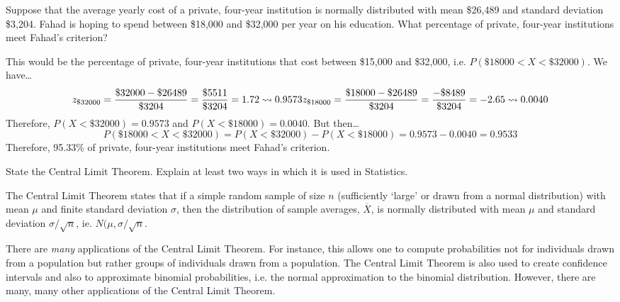 \documentclass[11pt,letterpaper]{article}
\begin{document}

 Suppose that the average yearly cost of a private, four-year institution is normally distributed with mean \$26,489 and standard deviation \$3,204. Fahad is hoping to spend between \$18,000 and \$32,000 per year on his education. What percentage of private, four-year institutions meet Fahad's criterion? \pspace

\sol This would be the percentage of private, four-year institutions that cost between \$15,000 and \$32,000, i.e. $P(\$18000 < X < \$32000)$. We have\dots
	\[
	\begin{aligned}
	z_{\$32000}= \dfrac{\$32000 - \$26489}{\$3204}= \dfrac{\$5511}{\$3204}= 1.72 \rightsquigarrow 0.9573
	z_{\$18000}= \dfrac{\$18000 - \$26489}{\$3204}= \dfrac{-\$8489}{\$3204}= -2.65 \rightsquigarrow 0.0040
	\end{aligned}
	\]
Therefore, $P(X < \$32000)= 0.9573$ and $P(X < \$18000)= 0.0040$. But then\dots
	\[
	P(\$18000 < X < \$32000)= P(X < \$32000) - P(X < \$18000)= 0.9573 - 0.0040= 0.9533
	\]
Therefore, 95.33\% of private, four-year institutions meet Fahad's criterion. 



\newpage



 State the Central Limit Theorem. Explain at least two ways in which it is used in Statistics. \pspace

\sol The Central Limit Theorem states that if a simple random sample of size $n$ (sufficiently `large' or drawn from a normal distribution) with mean $\mu$ and finite standard deviation $\sigma$, then the distribution of sample averages, $\overline{X}$, is normally distributed with mean $\mu$ and standard deviation $\sigma/\sqrt{n}$, ie. $N(\mu, \sigma/\sqrt{n}$. \pspace

There are \textit{many} applications of the Central Limit Theorem. For instance, this allows one to compute probabilities not for individuals drawn from a population but rather groups of individuals drawn from a population. The Central Limit Theorem is also used to create confidence intervals and also to approximate binomial probabilities, i.e. the normal approximation to the binomial distribution. However, there are many, many other applications of the Central Limit Theorem. 



\newpage
\end{document}
